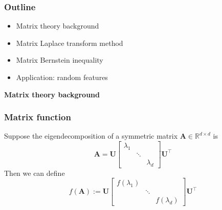 \documentclass[compress,
mathserif,wide,%
]{beamer}
\begin{document}
\begin{frame}
\frametitle{Outline}

\begin{itemize}
  \itemsep1em
  \item Matrix theory background
  \item Matrix Laplace transform method
  \item Matrix Bernstein inequality
  \item Application: random features
\end{itemize}

\end{frame}



\begin{frame}[plain]

\vfill
\begin{center}
  {\Large\bf Matrix theory background}
\end{center}

\vfill

\end{frame}




\begin{frame}
\frametitle{Matrix function}  

Suppose the eigendecomposition of a symmetric matrix $\bm{A}\in \mathbb{R}^{d\times d}$ is 
%
{\small
\[
\bm{A}=\bm{U}\left[\begin{array}{ccc}
\lambda_{1}\\
 & \ddots\\
 &  & \lambda_{d}
\end{array}\right]\bm{U}^{\top}
\]
}
%
Then we can define
%
{\small
\[
f(\bm{A}) := \bm{U}\left[\begin{array}{ccc}
f(\lambda_{1})\\
 & \ddots\\
 &  & f(\lambda_{d})
\end{array}\right]\bm{U}^{\top}
\]
}

\end{frame}
\end{document}
